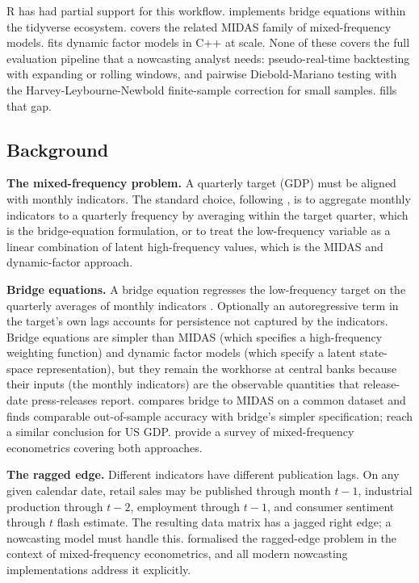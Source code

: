 R has had partial support for this workflow.  implements
bridge equations within the tidyverse ecosystem.  covers
the related MIDAS family of mixed-frequency models.  fits
dynamic factor models in C++ at scale. None of these covers the full
evaluation pipeline that a nowcasting analyst needs: pseudo-real-time
backtesting with expanding or rolling windows, and pairwise
Diebold-Mariano testing with the Harvey-Leybourne-Newbold finite-sample
correction for small samples.  fills that gap.

\subsection{Background}\label{background}

\textbf{The mixed-frequency problem.} A quarterly target (GDP) must be
aligned with monthly indicators. The standard choice, following
\citet{mariano2003new}, is to aggregate monthly indicators to a
quarterly frequency by averaging within the target quarter, which is the
bridge-equation formulation, or to treat the low-frequency variable as a
linear combination of latent high-frequency values, which is the MIDAS
and dynamic-factor approach.

\textbf{Bridge equations.} A bridge equation regresses the low-frequency
target on the quarterly averages of monthly indicators
\citep{baffigi2004bridge}. Optionally an autoregressive term in the
target's own lags accounts for persistence not captured by the
indicators. Bridge equations are simpler than MIDAS (which specifies a
high-frequency weighting function) and dynamic factor models (which
specify a latent state-space representation), but they remain the
workhorse at central banks because their inputs (the monthly indicators)
are the observable quantities that release-date press-releases report.
\citet{schumacher2016comparison} compares bridge to MIDAS on a common
dataset and finds comparable out-of-sample accuracy with bridge's
simpler specification; \citet{clements2008macroeconomic} reach a similar
conclusion for US GDP. \citet{foroni2013survey} provide a survey of
mixed-frequency econometrics covering both approaches.

\textbf{The ragged edge.} Different indicators have different
publication lags. On any given calendar date, retail sales may be
published through month \(t-1\), industrial production through \(t-2\),
employment through \(t-1\), and consumer sentiment through \(t\) flash
estimate. The resulting data matrix has a jagged right edge; a
nowcasting model must handle this. \citet{wallis1986forecasting}
formalised the ragged-edge problem in the context of mixed-frequency
econometrics, and all modern nowcasting implementations address it
explicitly.

